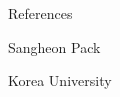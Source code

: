 
\prefix{}
\begin{rubric}{References}

{\large 
Sangheon Pack\par
Korea University\par}
\end{rubric}